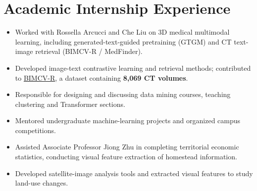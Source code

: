 \documentclass{resume}
\begin{document}
\section{\makebox[.75em][c]{\faUniversity} \textbf{Academic Internship Experience}}
\begin{itemize}
    \item Worked with Rossella Arcucci and Che Liu on 3D medical multimodal learning, including generated-text-guided pretraining (GTGM) and CT text-image retrieval (BIMCV-R / MedFinder).
    \item Developed image-text contrastive learning and retrieval methods; contributed to \href{https://github.com/ydchen0806/MedFinder}{BIMCV-R}, a dataset containing \textbf{8,069 CT volumes}.
\end{itemize}

\begin{itemize}
    \item Responsible for designing and discussing data mining courses, teaching clustering and Transformer sections.
    \item Mentored undergraduate machine-learning projects and organized campus competitions.
\end{itemize}

\begin{itemize}
    \item Assisted Associate Professor Jiong Zhu in completing territorial economic statistics, conducting visual feature extraction of homestead information.
    \item Developed satellite-image analysis tools and extracted visual features to study land-use changes.
\end{itemize}
\end{document}
